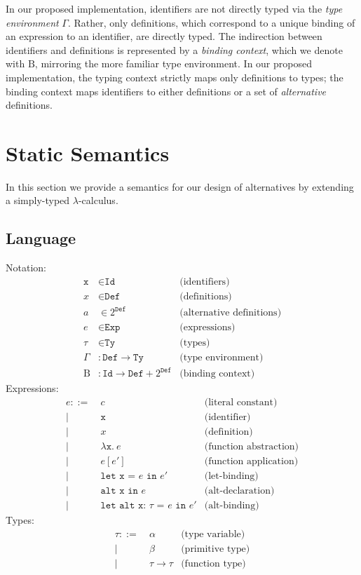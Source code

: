 \documentclass{article}
\renewcommand{\=}{\triangleq}
\begin{document}
In our proposed implementation, identifiers are not directly typed
via the \emph{type environment} $\Gamma$.
Rather, only definitions, which correspond to a unique binding of an expression
to an identifier, are directly typed.
The indirection between identifiers and definitions is represented by a
\emph{binding context}, which we denote with $\text{B}$,
mirroring the more familiar type environment.
In our proposed implementation, the typing context strictly maps only
definitions to types;
the binding context maps identifiers to either definitions or
a set of \emph{alternative} definitions.

\section{Static Semantics}

In this section we provide a semantics for our design of alternatives
by extending a simply-typed $\lambda$-calculus.

\subsection{Language}

Notation:
\begin{align*}
  \texttt{x} &\in \texttt{Id} & \text{(identifiers)} \\
  x &\in \texttt{Def} & \text{(definitions)} \\
  a &\in 2^{\texttt{Def}} & \text{(alternative definitions)} \\
  e &\in \texttt{Exp} & \text{(expressions)} \\
  \tau &\in \texttt{Ty} & \text{(types)} \\
  \Gamma &: \texttt{Def} \to \texttt{Ty} & \text{(type environment)} \\
  \text{B} &: \texttt{Id} \to \texttt{Def} + 2^{\texttt{Def}} & \text{(binding context)}
\end{align*}
Expressions:
\begin{align*}
  e ::=
   ~& c & \text{(literal constant)} \\
  |~& \texttt{x} & \text{(identifier)} \\
  |~& x & \text{(definition)} \\
  |~& \lambda \texttt{x} .~e & \text{(function abstraction)} \\
  |~& e[e'] & \text{(function application)} \\
  |~& \texttt{let x = $e$ in $e'$} & \text{(let-binding)} \\
  |~& \texttt{alt x in $e$} & \text{(alt-declaration)} \\
  |~& \texttt{let alt x: $\tau$ = $e$ in $e'$} & \text{(alt-binding)}
\end{align*}
Types:
\begin{align*}
  \tau ::=
   ~& \alpha & \text{(type variable)} \\
  |~& \beta & \text{(primitive type)} \\
  |~& \tau \to \tau & \text{(function type)}
\end{align*}
\end{document}
